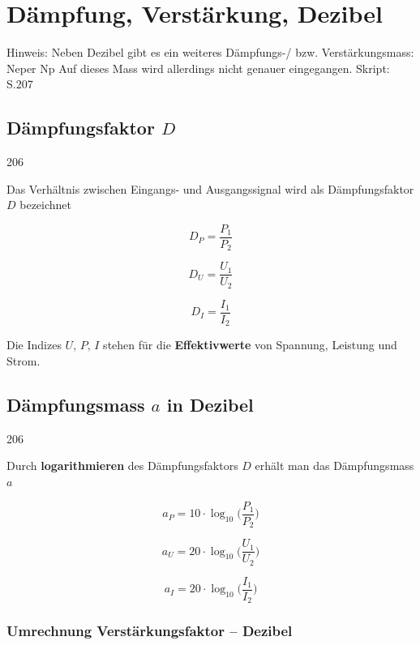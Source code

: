 \section{Dämpfung, Verstärkung, Dezibel}

Hinweis: Neben Dezibel gibt es ein weiteres Dämpfungs-/ bzw. Verstärkungsmass: Neper $\mathrm{Np}$
Auf dieses Mass wird allerdings nicht genauer eingegangen. Skript: S.207


\subsection{Dämpfungsfaktor $D$}{206}

Das Verhältnis zwischen Eingangs- und Ausgangssignal wird als Dämpfungsfaktor $D$ bezeichnet

\begin{minipage}[c]{0.3\columnwidth}
    $$ \boxed{ D_P = \frac{P_1}{P_2} } $$
\end{minipage}
\hfill
\begin{minipage}[c]{0.3\columnwidth}
    $$ \boxed{ D_U = \frac{U_1}{U_2} } $$
\end{minipage}
\hfill
\begin{minipage}[c]{0.3\columnwidth}
    $$ \boxed{ D_I = \frac{I_1}{I_2} } $$
\end{minipage}

Die Indizes $U, \, P, \, I$ stehen für die \textbf{Effektivwerte} von Spannung, Leistung und Strom.


\subsection{Dämpfungsmass $a$ in Dezibel}{206}

Durch \textbf{logarithmieren} des Dämpfungsfaktors $D$ erhält man das Dämpfungsmass $a$

\begin{minipage}[c]{0.3\columnwidth}
    $$ \boxed{ a_P =  10 \cdot \log_{10} \Big( \frac{P_1}{P_2} \Big) } $$
\end{minipage}
\hfill
\begin{minipage}[c]{0.3\columnwidth}
    $$ \boxed{ a_U = 20 \cdot \log_{10} \Big( \frac{U_1}{U_2} \Big) } $$
\end{minipage}
\hfill
\begin{minipage}[c]{0.3\columnwidth}
    $$ \boxed{ a_I = 20 \cdot \log_{10} \Big( \frac{I_1}{I_2} \Big) } $$
\end{minipage}


\subsubsection{Umrechnung Verstärkungsfaktor -- Dezibel}

